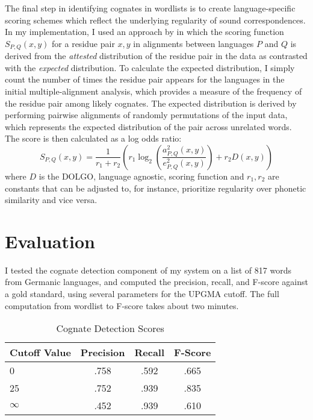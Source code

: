 \documentclass[doc,natbib,12pt]{apa6}
\begin{document}
The final step in identifying cognates in wordlists is to create language-specific scoring schemes which reflect the underlying regularity of sound correspondences. In my implementation, I used an approach by \citet{Kessler2001} in which the scoring function $S_{P,Q}(x,y)$ for a residue pair $x,y$ in alignments between languages $P$ and $Q$ is derived from the \emph{attested} distribution of the residue pair in the data as contrasted with the \emph{expected} distribution. To calculate the expected distribution, I simply count the number of times the residue pair appears for the languages in the initial multiple-alignment analysis, which provides a measure of the frequency of the residue pair among likely cognates. The expected distribution is derived by performing pairwise alignments of randomly permutations of the input data, which represents the expected distribution of the pair across unrelated words. The  score is then calculated as a log odds ratio: 
\begin{equation}
S_{P,Q}(x,y) = \frac{1}{r_1+r_2}\left(r_1\log_2\left(\frac{a^2_{P,Q}(x,y)}{e^2_{P,Q}(x,y)}\right)+r_2D(x,y)\right)
\end{equation}
where $D$ is the DOLGO, language agnostic, scoring function and $r_1,r_2$ are constants that can be adjusted to, for instance, prioritize regularity over phonetic similarity and vice versa.

\section{Evaluation}

I tested the cognate detection component of my system on a list of 817 words from Germanic languages, and computed the precision, recall, and F-score against a gold standard, using several parameters for the UPGMA cutoff. The full computation from wordlist to F-score takes about two minutes. 

\begin{table}[h]
	\centering
	\begin{tabular}{|l|ccc|}\hline
		Cutoff Value & Precision & Recall & F-Score\\\hline
		0 & .758 & .592 & .665\\
		25 & .752 & .939 & .835\\
		$\infty$ & .452 & .939 & .610 \\\hline
	\end{tabular}
	\caption{Cognate Detection Scores}
\end{table}
\end{document}
